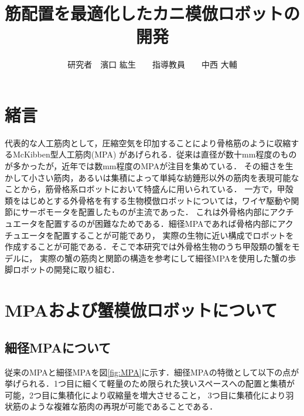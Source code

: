 \documentclass{jarticle}
\begin{document}

\title{
筋配置を最適化したカニ模倣ロボットの開発
}
\author{
研究者　濱口 紘生　　指導教員　　中西 大輔
}

\maketitle

\thispagestyle{empty}  %

\section{緒言}

代表的な人工筋肉として，圧縮空気を印加することにより骨格筋のように収縮するMcKibben型人工筋肉(MPA)
があげられる．従来は直径が数十mm程度のものが多かったが，近年では数mm程度のMPAが注目を集めている\cite{wakimoto}．
その細さを生かして小さい筋肉，あるいは集積によって単純な紡錘形以外の筋肉を表現可能なことから，筋骨格系ロボットにおいて特盛んに用いられている\cite{wakimoto}．
一方で，甲殻類をはじめとする外骨格を有する生物模倣ロボットについては，ワイヤ駆動や関節にサーボモータを配置したものが主流であった\cite{crabrobot1}．
これは外骨格内部にアクチュエータを配置するのが困難なためである．細径MPAであれば骨格内部にアクチュエータを配置することが可能であり，
実際の生物に近い構成でロボットを作成することが可能である．そこで本研究では外骨格生物のうち甲殻類の蟹をモデルに，
実際の蟹の筋肉と関節の構造を参考にして細径MPAを使用した蟹の歩脚ロボットの開発に取り組む．

\vspace*{-2mm}
\section{MPAおよび蟹模倣ロボットについて}

\vspace*{-1mm}
\subsection{細径MPAについて}

従来のMPAと細径MPAを図\ref{fig:MPA}に示す．細径MPAの特徴として以下の点が挙げられる．1つ目に細くて軽量のため限られた狭いスペースへの配置と集積が可能，2つ目に集積化により収縮量を増大させること，
3つ目に集積化により羽状筋のような複雑な筋肉の再現が可能であることである．
\end{document}
